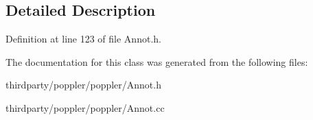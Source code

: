 \subsection{Detailed Description}


Definition at line 123 of file Annot.\+h.



The documentation for this class was generated from the following files\+:\begin{DoxyCompactItemize}
\item 
thirdparty/poppler/poppler/Annot.\+h\item 
thirdparty/poppler/poppler/Annot.\+cc\end{DoxyCompactItemize}
